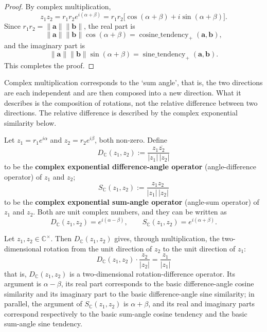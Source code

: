 \begin{proof}
By complex multiplication,
\[
z_1z_2
=
r_1r_2e^{i(\alpha+\beta)}
=
r_1r_2\bigl[\cos(\alpha+\beta)+i\sin(\alpha+\beta)\bigr].
\]
Since $r_1r_2=\|\mathbf a\|\|\mathbf b\|$, the real part is
\[
\|\mathbf a\|\|\mathbf b\|\cos(\alpha+\beta)
=
\operatorname{cosine\_tendency}_+(\mathbf a,\mathbf b),
\]
and the imaginary part is
\[
\|\mathbf a\|\|\mathbf b\|\sin(\alpha+\beta)
=
\operatorname{sine\_tendency}_+(\mathbf a,\mathbf b).
\]
This completes the proof.
\end{proof}

\begin{remark}
Complex multiplication corresponds to the `sum angle', that is, the two directions are each independent and are then composed into a new direction. What it describes is the composition of rotations, not the relative difference between two directions. The relative difference is described by the complex exponential similarity below.
\end{remark}

\begin{definition}\label{def:complex_diff_sum}
Let $z_1=r_1e^{i\alpha}$ and $z_2=r_2e^{i\beta}$, both non-zero. Define
\[
\boxed{
D_{\mathbb C}(z_1,z_2):=\frac{z_1\overline{z_2}}{|z_1|\,|z_2|}
}
\]
to be the \textbf{complex exponential difference-angle operator} (angle-difference operator) of $z_1$ and $z_2$;
\[
\boxed{
S_{\mathbb C}(z_1,z_2):=\frac{z_1z_2}{|z_1|\,|z_2|}
}
\]
to be the \textbf{complex exponential sum-angle operator} (angle-sum operator) of $z_1$ and $z_2$. Both are unit complex numbers, and they can be written as
\[
D_{\mathbb C}(z_1,z_2)=e^{i(\alpha-\beta)},\qquad
S_{\mathbb C}(z_1,z_2)=e^{i(\alpha+\beta)}.
\]
\end{definition}

\begin{proposition}\label{prop:complex_exp_similarity_rotation_operator}
Let $z_1,z_2\in\mathbb C^\times$. Then $D_{\mathbb C}(z_1,z_2)$ gives, through multiplication, the two-dimensional rotation from the unit direction of $z_2$ to the unit direction of $z_1$:
\[
\boxed{
D_{\mathbb C}(z_1,z_2)\cdot \frac{z_2}{|z_2|}
=
\frac{z_1}{|z_1|}
}
\]
that is, $D_{\mathbb C}(z_1,z_2)$ is a two-dimensional rotation-difference operator. Its argument is $\alpha-\beta$, its real part corresponds to the basic difference-angle cosine similarity and its imaginary part to the basic difference-angle sine similarity; in parallel, the argument of $S_{\mathbb C}(z_1,z_2)$ is $\alpha+\beta$, and its real and imaginary parts correspond respectively to the basic sum-angle cosine tendency and the basic sum-angle sine tendency.
\end{proposition}

